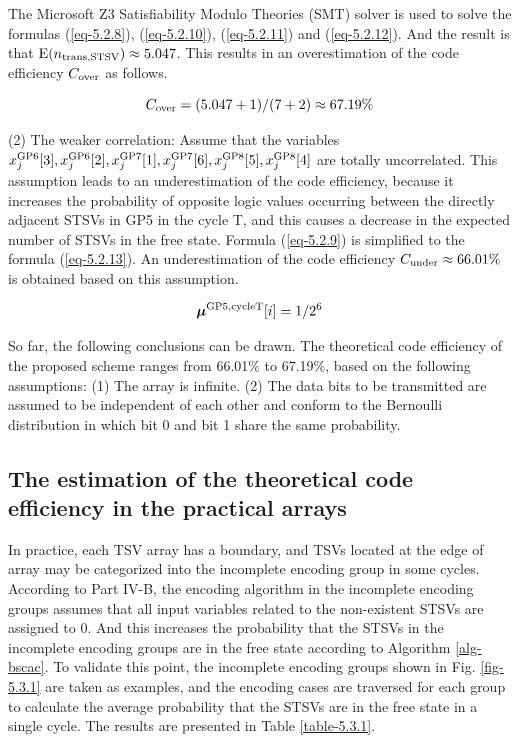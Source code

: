 \documentclass[lettersize,journal]{IEEEtran}
\begin{document}
 

The Microsoft Z3 Satisfiability Modulo Theories (SMT) solver \cite{A28_link_z3} is used to solve the formulas (\ref{eq-5.2.8}), (\ref{eq-5.2.10}), (\ref{eq-5.2.11}) and (\ref{eq-5.2.12}). And the result is that ${\rm E}(n_{\rm trans,STSV})\approx 5.047$. This results in an overestimation of the code efficiency $C_{\rm over}$ as follows.

\begin{equation}
	C_{\rm over} = (5.047+1)/(7+2)\approx 67.19\%
	\label{eq-CR_over}
\end{equation}

(2) The weaker correlation: Assume that the variables $x_j^{\rm GP6}[3], x_j^{\rm GP6}[2], x_j^{\rm GP7}[1], x_j^{\rm GP7}[6], x_j^{\rm GP8}[5], x_j^{\rm GP8}[4]$ are totally uncorrelated. This assumption leads to an underestimation of the code efficiency, because it increases the probability of opposite logic values occurring between the directly adjacent STSVs in GP5 in the cycle T, and this causes a decrease in the expected number of STSVs in the free state. Formula (\ref{eq-5.2.9}) is simplified to the formula (\ref{eq-5.2.13}). An underestimation of the code efficiency $C_{\rm under}\approx 66.01\%$ is obtained based on this assumption.

\begin{equation}
	\boldsymbol{\mu}^{\rm GP5, cycleT}[i] = 1/2^6
	\label{eq-5.2.13}
\end{equation}

So far, the following conclusions can be drawn. The theoretical code efficiency of the proposed scheme ranges from 66.01\% to 67.19\%, based on the following assumptions:
(1) The array is infinite.
(2) The data bits to be transmitted are assumed to be independent of each other and conform to the Bernoulli distribution in which bit 0 and bit 1 share the same probability.

\subsection{The estimation of the theoretical code efficiency in the practical arrays}\label{subsec-code_rate-esti_practical}
In practice, each TSV array has a boundary, and TSVs located at the edge of array may be categorized into the incomplete encoding group in some cycles. According to Part IV-B, the encoding algorithm in the incomplete encoding groups assumes that all input variables related to the non-existent STSVs are assigned to 0. And this increases the probability that the STSVs in the incomplete encoding groups are in the free state according to Algorithm \ref{alg-bscac}. To validate this point, the incomplete encoding groups shown in Fig. \ref{fig-5.3.1} are taken as examples, and the encoding cases are traversed for each group to calculate the average probability that the STSVs are in the free state in a single cycle. The results are presented in Table \ref{table-5.3.1}.
\end{document}
